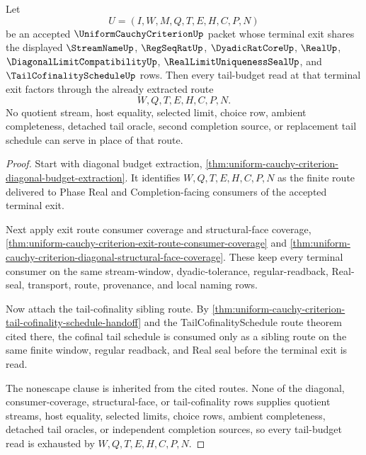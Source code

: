 \begin{theorem}
\label{thm:uniform-cauchycriterion-diagonal-tail-budget-exhaustion}
Let
$$
U=(I,W,M,Q,T,E,H,C,P,N)
$$
be an accepted $\UniformCauchyCriterionUp$ packet whose terminal exit shares the displayed $\StreamNameUp$, $\RegSeqRatUp$, $\DyadicRatCoreUp$, $\RealUp$, $\DiagonalLimitCompatibilityUp$, $\RealLimitUniquenessSealUp$, and $\TailCofinalityScheduleUp$ rows. Then every tail-budget read at that terminal exit factors through the already extracted route
$$
W,Q,T,E,H,C,P,N.
$$
No quotient stream, host equality, selected limit, choice row, ambient completeness, detached tail oracle, second completion source, or replacement tail schedule can serve in place of that route.
\end{theorem}
\begin{proof}
Start with diagonal budget extraction, \autoref{thm:uniform-cauchy-criterion-diagonal-budget-extraction}. It identifies $W,Q,T,E,H,C,P,N$ as the finite route delivered to Phase Real and Completion-facing consumers of the accepted terminal exit.

Next apply exit route consumer coverage and structural-face coverage, \autoref{thm:uniform-cauchy-criterion-exit-route-consumer-coverage} and \autoref{thm:uniform-cauchy-criterion-diagonal-structural-face-coverage}. These keep every terminal consumer on the same stream-window, dyadic-tolerance, regular-readback, Real-seal, transport, route, provenance, and local naming rows.

Now attach the tail-cofinality sibling route. By \autoref{thm:uniform-cauchy-criterion-tail-cofinality-schedule-handoff} and the TailCofinalitySchedule route theorem cited there, the cofinal tail schedule is consumed only as a sibling route on the same finite window, regular readback, and Real seal before the terminal exit is read.

The nonescape clause is inherited from the cited routes. None of the diagonal, consumer-coverage, structural-face, or tail-cofinality rows supplies quotient streams, host equality, selected limits, choice rows, ambient completeness, detached tail oracles, or independent completion sources, so every tail-budget read is exhausted by $W,Q,T,E,H,C,P,N$.
\end{proof}

